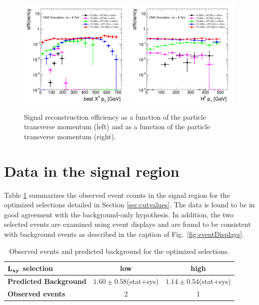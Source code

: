 \begin{figure}[htbp]
\includegraphics[width=0.49\textwidth]{plots/signal/effXPt.pdf}
\includegraphics[width=0.49\textwidth]{plots/signal/effHPt.pdf}
\caption{Signal reconstruction efficiency as a function of the \X particle transverse 
momentum (left) and as a function of the \Higgs particle transverse momentum (right).
\label{fig:effPt}}
\end{figure}


\section{Data in the signal region}
\label{sec:fullunblinding}

Table \ref{tab:fullunblinding} summarizes the observed event counts in the signal region for the optimized 
selections detailed in Section \ref{sec:cutvalues}. The data is found to be in good agreement with the 
background-only hypothesis. In addition, the two selected events are examined using event displays
and are found to be consistent with background events as described in the caption of 
Fig.~\ref{fig:eventDisplays}.  

\begin{table}[htbp]
\centering
\caption{Observed events and predicted background for the optimized selections.\label{tab:fullunblinding}}
\vspace{0.1cm}
\begin{tabular}{|l|c|c|}
\hline
$\bf L_{xy}$ \bf selection & \bf low & \bf high \\
\hline
\bf Predicted Background & $ 1.60\pm0.58$(stat+sys) & $ 1.14\pm0.54$(stat+sys) \\
\hline
\bf Observed events & 2 & 1 \\ 
\hline
\end{tabular}
\end{table}

